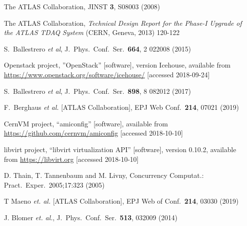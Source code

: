 \documentclass{webofc}
\begin{document}
\begin{thebibliography}{}
   The ATLAS Collaboration,
   JINST \textbf{3}, S08003 (2008)

    The ATLAS Collaboration, \textit{Technical Design Report for the Phase-I
    Upgrade of the ATLAS TDAQ System} (CERN, Geneva, 2013) 120-122

    S.~Ballestrero {\it et al},
    J.\ Phys.\ Conf.\ Ser.\  \textbf{664}, 2 022008 (2015)

    Openstack project, ”OpenStack” [software], version Icehouse, available from
    \url{https://www.openstack.org/software/icehouse/} [accessed 2018-09-24]

    S.~Ballestrero {\it et al},
    J.\ Phys.\ Conf.\ Ser.\  \textbf{898},  8 082012 (2017)

    F.~Berghaus {\it et al.} [ATLAS Collaboration],
    EPJ Web Conf.\ \textbf{214}, 07021 (2019)

    CernVM project, ``amiconfig'' [software], available from
    \url{https://github.com/cernvm/amiconfig} [accessed 2018-10-10]

    libvirt project, ``libvirt virtualization API'' [software], version 0.10.2,
    available from \url{https://libvirt.org} [accessed 2018-10-10]

    D. Thain, T. Tannenbaum and M. Livny,
    Concurrency Computat.: Pract.\ Exper.\ 2005;17:323 (2005)

    T Maeno \textit{et. al.} [ATLAS Collaboration],
    EPJ Web of Conf.\ \textbf{214}, 03030 (2019)

    J. Blomer \textit{et. al.},
    J.\ Phys.\ Conf.\ Ser.\ \textbf{513}, 032009 (2014)

\end{thebibliography}
\end{document}
